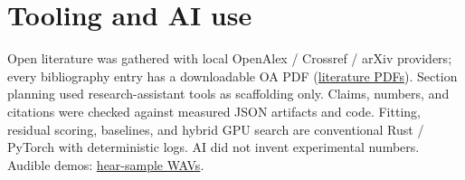 \section{Tooling and AI use}
\label{sec:tooling}

Open literature was gathered with local OpenAlex / Crossref / arXiv providers; every bibliography entry has a downloadable OA PDF
(\href{https://github.com/reeldemo/denoise-opt-meta/tree/master/artifacts/literature_oa/pdfs}{literature PDFs}).
Section planning used research-assistant tools as scaffolding only.
Claims, numbers, and citations were checked against measured JSON artifacts and code.
Fitting, residual scoring, baselines, and hybrid GPU search are conventional Rust / PyTorch with deterministic logs.
AI did not invent experimental numbers.
Audible demos:
\href{https://github.com/reeldemo/reelsynth/tree/main/brand/artifacts/meta_approach_compare/hear_samples}{hear-sample WAVs}.
